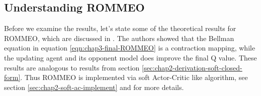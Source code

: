 \label{sec:chap3-ROMMEO-interpretation}

\subsection{Understanding ROMMEO}
Before we examine the results, let's state some of the theoretical results for ROMMEO, which are discussed in \cite{tian2019regularized}. The authors showed that the Bellman equation in equation \ref{eqn:chap3-final-ROMMEO} is a contraction mapping, while the updating agent and its opponent model does improve the final Q value. These results are analogous to results from section \ref{sec:chap2-derivation-soft-closed-form}. Thus ROMMEO is implemented via soft Actor-Critic like algorithm, see section \ref{sec:chap2-soft-ac-implement} and \cite{tian2019regularized} for more details. 

